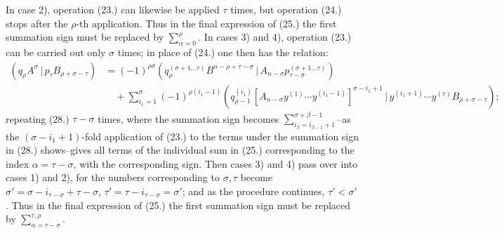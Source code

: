 \documentclass[11pt]{article}
\providecommand{\pair}[2]{(#1\,|\,#2)}
\begin{document}
In case 2), operation (23.) can likewise be applied $\tau$ times, but operation (24.) stops after the $\rho$-th application. Thus in the final expression of (25.) the first summation sign must be replaced by $\sum_{\alpha=0}^{\rho}$. In cases 3) and 4), operation (23.) can be carried out only $\sigma$ times; in place of (24.) one then has the relation:
\begin{equation}
\begin{aligned}
\pair{q_\rho A^\sigma}{p_\tau B_{\rho+\sigma-\tau}}
&=(-1)^{\rho\sigma}
 \pair{q_\rho^{(\sigma+1\ldots\tau)}B^{n-\rho+\tau-\sigma}}{A_{n-\sigma}p_{\tau-\sigma}^{(\sigma+1\ldots\tau)}}\\
&\quad+\sum_{i_1=1}^{\sigma}(-1)^{\rho(i_1-1)}
 \pair{q_{\rho-1}^{(i_1)}[A_{n-\sigma}y^{(1)}\cdots y^{(i_1-1)}]^{\sigma-i_1+1}}
 {y^{(i_1+1)}\cdots y^{(\tau)}B_{\rho+\sigma-\tau}};
\end{aligned}
\tag{28}
\end{equation}
repeating (28.) $\tau-\sigma$ times, where the summation sign becomes $\sum_{i_\beta=i_{\beta-1}+1}^{\sigma+\beta-1}$--as the $(\sigma-i_1+1)$-fold application of (23.) to the terms under the summation sign in (28.) shows--gives all terms of the individual sum in (25.) corresponding to the index $\alpha=\tau-\sigma$, with the corresponding sign. Then cases 3) and 4) pass over into cases 1) and 2), for the numbers corresponding to $\sigma,\tau$ become $\sigma'=\sigma-i_{\tau-\sigma}+\tau-\sigma$, $\tau'=\tau-i_{\tau-\sigma}=\sigma'$; and as the procedure continues, $\tau'<\sigma'$. Thus in the final expression of (25.) the first summation sign must be replaced by $\sum_{\alpha=\tau-\sigma}^{\tau,\rho}$.
\end{document}
